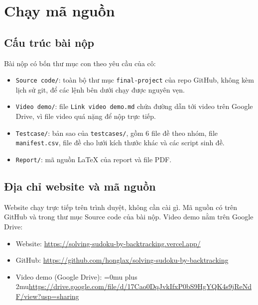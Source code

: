 \chapter{Chạy mã nguồn}

\section{Cấu trúc bài nộp}

Bài nộp có bốn thư mục con theo yêu cầu của cô:

\begin{itemize}
  \item \texttt{Source code/}: toàn bộ thư mục \texttt{final-project} của repo GitHub, không kèm lịch sử git, để các lệnh bên dưới chạy được nguyên vẹn.
  \item \texttt{Video demo/}: file \texttt{Link video demo.md} chứa đường dẫn tới video trên Google Drive, vì file video quá nặng để nộp trực tiếp.
  \item \texttt{Testcase/}: bản sao của \texttt{testcases/}, gồm 6 file đề theo nhóm, file \texttt{manifest.csv}, file đề cho lưới kích thước khác và các script sinh đề.
  \item \texttt{Report/}: mã nguồn LaTeX của report và file PDF.
\end{itemize}

\section{Địa chỉ website và mã nguồn}

Website chạy trực tiếp trên trình duyệt, không cần cài gì. Mã nguồn có trên GitHub và trong thư mục Source code của bài nộp. Video demo nằm trên Google Drive:

\begin{itemize}
  \item Website: \url{https://solving-sudoku-by-backtracking.vercel.app/}
  \item GitHub: \url{https://github.com/honglax/solving-sudoku-by-backtracking}
  \item Video demo (Google Drive): {\expandafter\def\expandafter\UrlBreaks\expandafter{\UrlBreaks\do\a\do\b\do\c\do\d\do\e\do\f\do\g\do\h\do\i\do\j\do\k\do\l\do\m\do\n\do\o\do\p\do\q\do\r\do\s\do\t\do\u\do\v\do\w\do\x\do\y\do\z\do\A\do\B\do\C\do\D\do\E\do\F\do\G\do\H\do\I\do\J\do\K\do\L\do\M\do\N\do\O\do\P\do\Q\do\R\do\S\do\T\do\U\do\V\do\W\do\X\do\Y\do\Z\do\0\do\1\do\2\do\3\do\4\do\5\do\6\do\7\do\8\do\9}\Urlmuskip=0mu plus 2mu\relax\url{https://drive.google.com/file/d/17Cao0DqJvkIfxP0bS9HgYQK4s9jReNdF/view?usp=sharing}}
\end{itemize}

